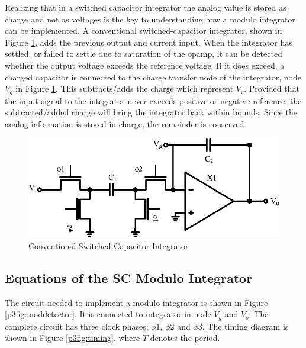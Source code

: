 Realizing that in a switched capacitor integrator the analog value is
stored as charge and not as voltages is the key to understanding how a
modulo integrator can be implemented. A conventional
switched-capacitor integrator, shown in Figure \ref{p3fig:integrator}, adds the previous
output and current input. When the
integrator has settled, or failed to settle due to saturation of the opamp, it can be detected whether the output voltage
exceeds the reference voltage. If it does exceed, a charged capacitor is connected to
the charge transfer node of the integrator, node $V_g$ in Figure \ref{p3fig:integrator}. This subtracts/adds the charge
which represent $V_r$. Provided that the input signal
to the integrator never exceeds positive or negative reference, the
subtracted/added charge will bring the integrator back within bounds. Since the analog information is
stored in charge, the remainder is conserved. 

\begin{figure}[ht]
\centering 
 \includegraphics[width=\myfigwidth]{graphics/integrator}
  \caption{Conventional Switched-Capacitor Integrator}
  \label{p3fig:integrator}
\end{figure}

\subsection{Equations of the SC Modulo Integrator}

The circuit needed to implement a modulo integrator is shown in Figure
\ref{p3fig:moddetector}. It is connected to integrator in node $V_g$ and
$V_o$.
The complete circuit has
three clock phases; $\phi 1$, $\phi 2$ and $\phi 3$. The timing
diagram is shown in Figure \ref{p3fig:timing}, where $T$ denotes the period. 


